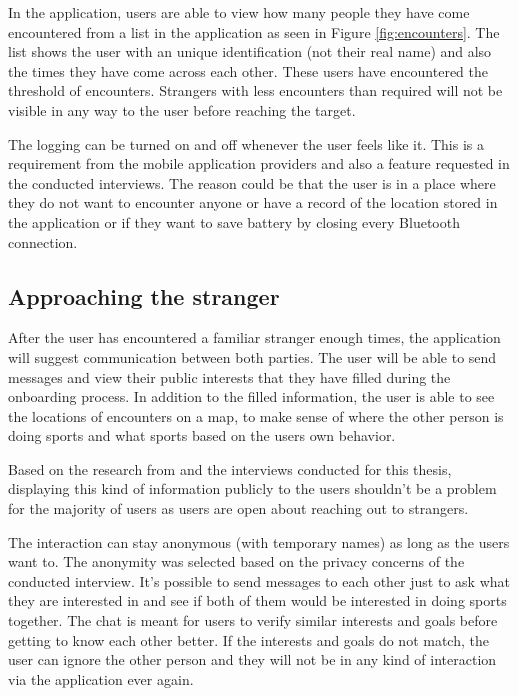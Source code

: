 In the application, users are able to view how many people they have come encountered from a list in the application as seen in Figure \ref{fig:encounters}. The list shows the user with an unique identification (not their real name) and also the times they have come across each other. These users have encountered the threshold of encounters. Strangers with less encounters than required will not be visible in any way to the user before reaching the target.

The logging can be turned on and off whenever the user feels like it. This is a requirement from the mobile application providers and also a feature requested in the conducted interviews. The reason could be that the user is in a place where they do not want to encounter anyone or have a record of the location stored in the application or if they want to save battery by closing every Bluetooth connection.

\subsection{Approaching the stranger}

After the user has encountered a familiar stranger enough times, the application will suggest communication between both parties. The user will be able to send messages and view their public interests that they have filled during the onboarding process. In addition to the filled information, the user is able to see the locations of encounters on a map, to make sense of where the other person is doing sports and what sports based on the users own behavior. 

Based on the  research from \cite{socialAdHoc} and the interviews conducted for this thesis, displaying this kind of information publicly to the users shouldn't be a problem for the majority of users as users are open about reaching out to strangers.

The interaction can stay anonymous (with temporary names) as long as the users want to. The anonymity was selected based on the privacy concerns of the conducted interview. It's possible to send messages to each other just to ask what they are interested in and see if both of them would be interested in doing sports together. The chat is meant for users to verify similar interests and goals before getting to know each other better. If the interests and goals do not match, the user can ignore the other person and they will not be in any kind of interaction via the application ever again.

